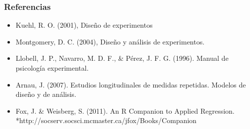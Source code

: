 \documentclass[12pt]{beamer}
\begin{document}
\begin{frame}
\frametitle{Referencias}
\begin{itemize}
\item Kuehl, R. O. (2001), Diseño de experimentos

\item Montgomery, D. C. (2004), Diseño y análisis de experimentos.

\item Llobell, J. P., Navarro, M. D. F., \& Pérez, J. F. G. (1996). Manual de psicología experimental.

\item Arnau, J. (2007). Estudios longitudinales de medidas repetidas. Modelos de diseño y de análisis. 

\item Fox, J. \&  Weisberg, S. (2011). An {R} Companion to Applied Regression.
*http://socserv.socsci.mcmaster.ca/jfox/Books/Companion
\end{itemize}
\end{frame}
\end{document}
